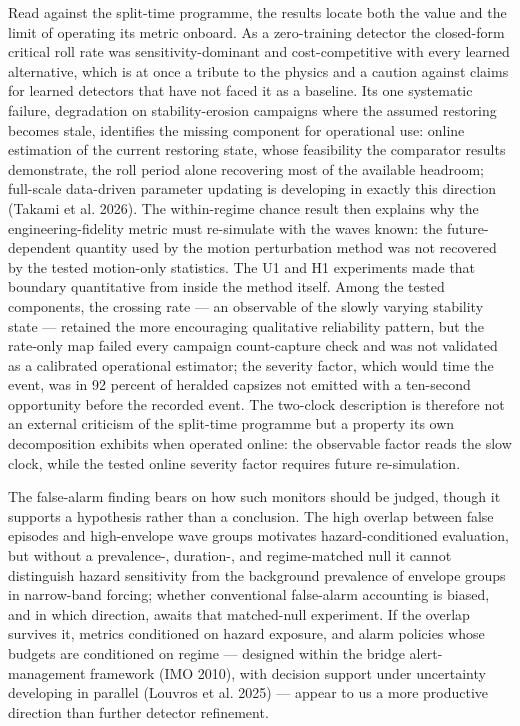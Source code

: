 \documentclass[11pt]{article}
\begin{document}
Read against the split-time programme, the results locate both the value and the limit of
operating its metric onboard. As a zero-training detector the closed-form critical roll rate was
sensitivity-dominant and cost-competitive with every learned alternative, which is at once a
tribute to the physics and a caution against claims for learned detectors that have not faced it
as a baseline. Its one systematic failure, degradation on stability-erosion campaigns where the
assumed restoring becomes stale, identifies the missing component for operational use: online
estimation of the current restoring state, whose feasibility the comparator results demonstrate,
the roll period alone recovering most of the available headroom; full-scale data-driven
parameter updating is developing in exactly this direction (Takami et al. 2026). The within-regime chance result
then explains why the engineering-fidelity metric must re-simulate with the waves known: the
future-dependent quantity used by the motion perturbation method was not recovered by the tested
motion-only statistics. The U1 and H1 experiments made that boundary quantitative from
inside the method itself. Among the tested components, the crossing rate --- an observable of the
slowly varying stability state --- retained the more encouraging qualitative reliability pattern,
but the rate-only map failed every campaign count-capture check and was not validated as a
calibrated operational estimator; the severity factor, which would time the event, was in 92
percent of heralded capsizes not emitted with a ten-second opportunity before the recorded
event. The two-clock description is therefore not an external criticism of the split-time
programme but a property its own decomposition exhibits when operated online: the observable
factor reads the slow clock, while the tested online severity factor requires future
re-simulation.

The false-alarm finding bears on how such monitors should be judged, though it supports a
hypothesis rather than a conclusion. The high overlap between false episodes and high-envelope
wave groups motivates hazard-conditioned evaluation, but without a prevalence-, duration-, and
regime-matched null it cannot distinguish hazard sensitivity from the background prevalence of
envelope groups in narrow-band forcing; whether conventional false-alarm accounting is biased,
and in which direction, awaits that matched-null experiment. If the overlap survives it,
metrics conditioned on hazard exposure, and alarm policies whose budgets are conditioned on
regime --- designed within the bridge alert-management framework (IMO 2010), with decision
support under uncertainty developing in parallel (Louvros et al. 2025) --- appear to us a more
productive direction than further detector refinement.
\end{document}
